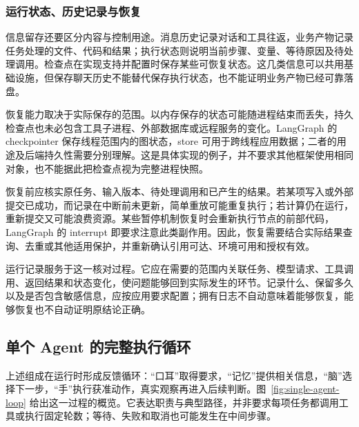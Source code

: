 \documentclass[11pt,a4paper]{article}
\begin{document}
\subsubsection{运行状态、历史记录与恢复}
\label{sec:single-agent-recovery}

信息留存还要区分内容与控制用途。消息历史记录对话和工具往返，业务产物记录任务处理的文件、代码和结果；执行状态则说明当前步骤、变量、等待原因及待处理调用。检查点在实现支持并配置时保存某些可恢复状态。这几类信息可以共用基础设施，但保存聊天历史不能替代保存执行状态，也不能证明业务产物已经可靠落盘。

恢复能力取决于实际保存的范围。以内存保存的状态可能随进程结束而丢失，持久检查点也未必包含工具子进程、外部数据库或远程服务的变化。LangGraph 的 checkpointer 保存线程范围内的图状态，store 可用于跨线程应用数据；二者的用途及后端持久性需要分别理解\cite{langgraph-persist}。这是具体实现的例子，并不要求其他框架使用相同对象，也不能据此把检查点视为完整进程快照。

恢复前应核实原任务、输入版本、待处理调用和已产生的结果。若某项写入或外部提交已成功，而记录在中断前未更新，简单重放可能重复执行；若计算仍在运行，重新提交又可能浪费资源。某些暂停机制恢复时会重新执行节点的前部代码，LangGraph 的 interrupt 即要求注意此类副作用\cite{langgraph-interrupt}。因此，恢复需要结合实际结果查询、去重或其他适用保护，并重新确认引用可达、环境可用和授权有效。

运行记录服务于这一核对过程。它应在需要的范围内关联任务、模型请求、工具调用、返回结果和状态变化，使问题能够回到实际发生的环节。记录什么、保留多久以及是否包含敏感信息，应按应用要求配置；拥有日志不自动意味着能够恢复，能够恢复也不自动证明原结论正确。

\subsection{单个 Agent 的完整执行循环}
\label{sec:single-agent-cycle}

上述组成在运行时形成反馈循环：“口耳”取得要求，“记忆”提供相关信息，“脑”选择下一步，“手”执行获准动作，真实观察再进入后续判断。图~\ref{fig:single-agent-loop} 给出这一过程的概览。它表达职责与典型路径，并非要求每项任务都调用工具或执行固定轮数；等待、失败和取消也可能发生在中间步骤。
\end{document}
